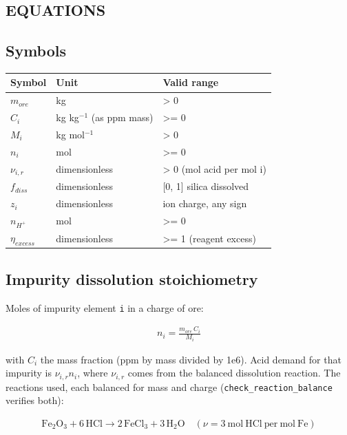 \documentclass[10pt,a4paper,twoside]{report}
\begin{document}
\subsection*{EQUATIONS}

\subsection*{Symbols}

\begin{center}
\footnotesize
\begin{tabular}{@{}llp{}@{}}
\toprule
Symbol & Unit & Valid range \\
\midrule
$m_{ore}$ & kg & > 0 \\
$C_i$ & kg kg$^{-1}$ (as ppm mass) & >= 0 \\
$M_i$ & kg mol$^{-1}$ & > 0 \\
$n_i$ & mol & >= 0 \\
$\nu_{i,r}$ & dimensionless & > 0 (mol acid per mol i) \\
$f_{diss}$ & dimensionless & [0, 1] silica dissolved \\
$z_i$ & dimensionless & ion charge, any sign \\
$n_{H^+}$ & mol & >= 0 \\
$\eta_{excess}$ & dimensionless & >= 1 (reagent excess) \\
\bottomrule
\end{tabular}
\end{center}

\subsection*{Impurity dissolution stoichiometry}

Moles of impurity element \texttt{i} in a charge of ore:

\begin{equation*}
\begin{gathered}
n_i = \frac{m_{ore}\,C_i}{M_i}
\end{gathered}
\end{equation*}

with $C_i$ the mass fraction (ppm by mass divided by 1e6). Acid demand for that impurity is $\nu_{i,r} n_i$, where $\nu_{i,r}$ comes from the balanced dissolution reaction. The reactions used, each balanced for mass and charge (\texttt{check\_reaction\_balance} verifies both):

\begin{equation*}
\begin{gathered}
\mathrm{Fe_2O_3} + 6\,\mathrm{HCl} \rightarrow 2\,\mathrm{FeCl_3} + 3\,\mathrm{H_2O} \quad (\nu = 3\ \mathrm{mol\ HCl\ per\ mol\ Fe})
\end{gathered}
\end{equation*}
\end{document}
